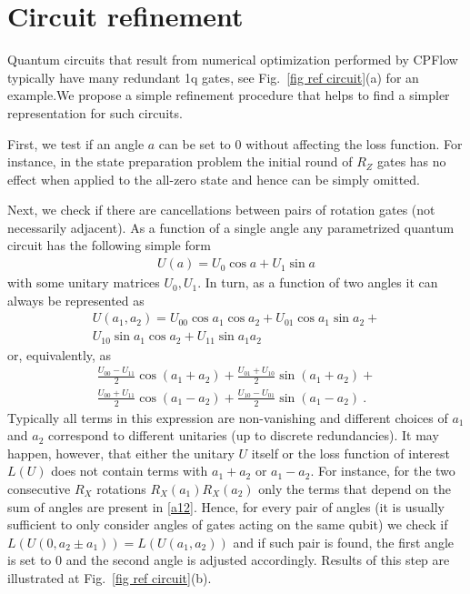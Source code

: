 \documentclass[twocolumn, amsfonts, amssymb, aps, nofootinbib]{revtex4-2}
\newcommand{\package}[1]{\textrm {#1 }}
\newcommand{\cpflow}{\package{CPFlow}}
\begin{document}
\section{Circuit refinement \label{app exact}}
Quantum circuits that result from numerical optimization performed by \cpflow typically have many redundant 1q gates, see Fig.~\ref{fig ref circuit}(a) for an example.We propose a simple refinement procedure that helps to find a simpler representation for such circuits.

First, we test if an angle $a$ can be set to 0 without affecting the loss function. For instance, in the state preparation problem the initial round of $R_Z$ gates has no effect when applied to the all-zero state and hence can be simply omitted.

Next, we check if there are cancellations between pairs of rotation gates (not necessarily adjacent). As a function of a single angle any parametrized quantum circuit has the following simple form
\begin{align}
U(a)=U_0 \cos a+U_1\sin a
\end{align}
with some unitary matrices $U_0, U_1$. In turn, as a function of two angles it can always be represented as
\begin{multline}
U(a_1, a_2)=U_{00}\cos a_1\cos a_2+U_{01}\cos a_1\sin a_2+\\U_{10}\sin a_1\cos a_2+U_{11}\sin a_1 a_2
\end{multline}
or, equivalently, as
\begin{multline}
\frac{U_{00}-U_{11}}2\cos{(a_1+a_2)}+\frac{U_{01}+U_{10}}2\sin{(a_1+a_2)}+\\\frac{U_{00}+U_{11}}2\cos{(a_1-a_2)}+\frac{U_{10}-U_{01}}2\sin{(a_1-a_2)} \ . \label{a12}
\end{multline}
Typically all terms in this expression are non-vanishing and different choices of $a_1$ and $a_2$ correspond to different unitaries (up to discrete redundancies). It may happen, however, that either the unitary $U$ itself or the loss function of interest $L(U)$ does not contain terms with $a_1+a_2$ or $a_1-a_2$. For instance, for the two consecutive $R_X$ rotations $R_X(a_1)R_X(a_2)$ only the terms that depend on the sum of angles are present in \eqref{a12}. Hence, for every pair of angles (it is usually sufficient to only consider angles of gates acting on the same qubit) we check if $L(U(0, a_2\pm a_1))=L(U(a_1, a_2))$  and if such pair is found, the first angle is set to 0 and the second angle is adjusted accordingly. Results of this step are illustrated at Fig.~\ref{fig ref circuit}(b).
\end{document}
